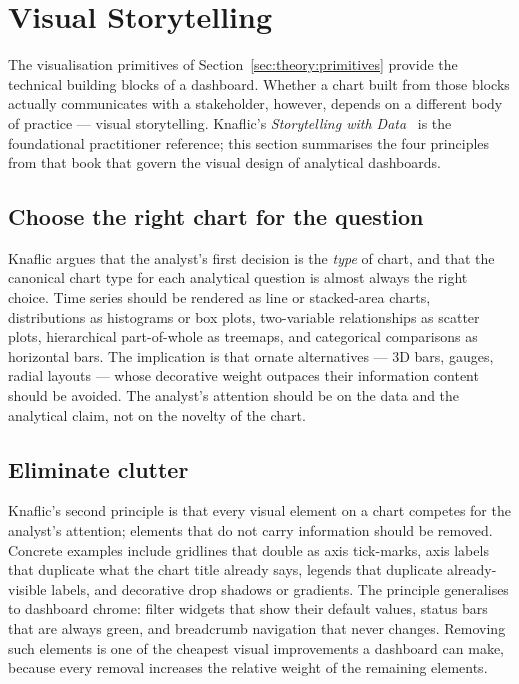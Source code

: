 \section{Visual Storytelling}
\label{sec:theory:storytelling}

The visualisation primitives of
Section~\ref{sec:theory:primitives} provide the technical
building blocks of a dashboard. Whether a chart built from
those blocks actually communicates with a stakeholder, however,
depends on a different body of practice --- visual
storytelling. Knaflic's \emph{Storytelling with
Data}~\cite{knaflic2015} is the foundational practitioner
reference; this section summarises the four principles from
that book that govern the visual design of analytical
dashboards.

\subsection{Choose the right chart for the question}

Knaflic argues that the analyst's first decision is the
\emph{type} of chart, and that the canonical chart type for
each analytical question is almost always the right choice.
Time series should be rendered as line or stacked-area charts,
distributions as histograms or box plots, two-variable
relationships as scatter plots, hierarchical part-of-whole as
treemaps, and categorical comparisons as horizontal bars. The
implication is that ornate alternatives --- 3D bars, gauges,
radial layouts --- whose decorative weight outpaces their
information content should be avoided. The analyst's attention
should be on the data and the analytical claim, not on the
novelty of the chart.

\subsection{Eliminate clutter}

Knaflic's second principle is that every visual element on a
chart competes for the analyst's attention; elements that do
not carry information should be removed. Concrete examples
include gridlines that double as axis tick-marks, axis labels
that duplicate what the chart title already says, legends
that duplicate already-visible labels, and decorative drop
shadows or gradients. The principle generalises to dashboard
chrome: filter widgets that show their default values, status
bars that are always green, and breadcrumb navigation that
never changes. Removing such elements is one of the cheapest
visual improvements a dashboard can make, because every
removal increases the relative weight of the remaining
elements.

